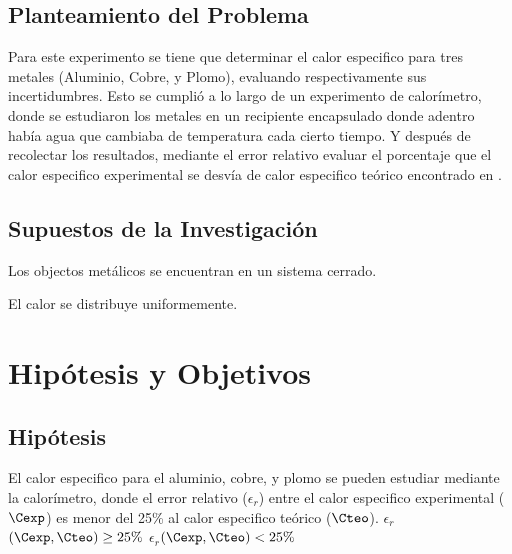 \documentclass[12pt,a4paper]{config/myConfig}
\begin{document}
\subsection{Planteamiento del Problema}
\label{sec:PLANTAMIENTO-PROBLEMA}

Para este experimento se tiene que determinar el calor especifico para tres metales (Aluminio, Cobre, y Plomo), evaluando respectivamente sus incertidumbres. Esto se cumplió a lo largo de un experimento de calorímetro, donde se estudiaron los metales en un recipiente encapsulado donde adentro había agua que cambiaba de temperatura cada cierto tiempo. Y después de recolectar los resultados, mediante el error relativo evaluar el porcentaje que el calor especifico experimental se desvía de calor especifico teórico encontrado en  \textcite{physicsTextbook}.  

\subsection{Supuestos de la Investigación}
\label{sec:SUPUESTOS}

\begin{supuestos}
  \item \label{su:uno} Los objectos metálicos se encuentran en un sistema cerrado.
  \item \label{su:dos} El calor se distribuye uniformemente.
\end{supuestos}

\section{Hipótesis y Objetivos}
\label{sec:HIPOTESIS-OBJECTIVOS}

\subsection{Hipótesis}
\label{sec:HIPOTESIS}


\begin{hipotesis}
  {El calor especifico para el aluminio, cobre, y plomo se pueden estudiar mediante la calorímetro, donde el error relativo ($\epsilon_r$) entre el calor especifico experimental ($\Cexp$) es menor del 25\% al calor especifico teórico ($\Cteo$).}
  {\Large$\epsilon_r$\normalsize$(\Cexp,\Cteo) \geq 25\%$} %
  {\Large$\epsilon_r$\normalsize$(\Cexp,\Cteo) < 25\%$} %
  {}
  {}
\end{hipotesis}
\end{document}
